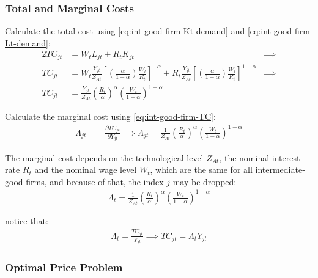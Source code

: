 \documentclass[
	12pt,
	]{article}
\numberwithin{equation}{section}
\theoremstyle{definition}
\theoremstyle{plain}
\theoremstyle{plain}
\theoremstyle{plain}
\begin{document}
\subsubsection*{Total and Marginal Costs}

Calculate the total cost using \ref{eq:int-good-firm-Kt-demand} and \ref{eq:int-good-firm-Lt-demand}:
\begin{alignat}{2}
	TC_{jt} & = W_t L_{jt} + R_t K_{jt} &\implies \nonumber \\
	TC_{jt} & = W_t \frac{Y_{jt}}{Z_{At}} \left[ \left( \frac{\alpha}{1-\alpha} \right) \frac{W_t}{R_t} \right]^{-\alpha} + R_t \frac{Y_{jt}}{Z_{At}} \left[ \left( \frac{\alpha}{1-\alpha} \right) \frac{W_t}{R_t} \right]^{1-\alpha} &\implies \nonumber \\
	TC_{jt} & = \frac{Y_{jt}}{Z_{At}} \left( \frac{R_t}{\alpha} \right)^{\alpha} \left( \frac{W_t}{1-\alpha} \right)^{1-\alpha} \label{eq:int-good-firm-TC}
\end{alignat}


Calculate the marginal cost using \ref{eq:int-good-firm-TC}: 
\begin{align}
\label{eq:int-good-firm-MC}
	\Lambda_{jt} & = \frac{\partial TC_{jt}}{\partial Y_{jt}}
\implies 
	\Lambda_{jt} = \frac{1}{Z_{At}} \left( \frac{R_t}{\alpha} \right)^{\alpha} \left( \frac{W_t}{1-\alpha} \right)^{1-\alpha}
\end{align}

The marginal cost depends on the technological level $Z_{At}$, the nominal interest rate $R_t$ and the nominal wage level $W_t$, which are the same for all intermediate-good firms, and because of that, the index $j$ may be dropped:
\begin{align}
	\label{eq:int-good-firm-MC-2}
	\Lambda_t = \frac{1}{Z_{At}} \left( \frac{R_t}{\alpha} \right)^{\alpha} \left( \frac{W_t}{1-\alpha} \right)^{1-\alpha}
\end{align}

notice that:
\begin{align}
\label{eq:int-good-firm-TC-MC}
	\Lambda_t = \frac{TC_{jt}}{Y_{jt}} \implies 
	TC_{jt} = \Lambda_t Y_{jt}
\end{align}


\subsubsection*{Optimal Price Problem}
\end{document}
